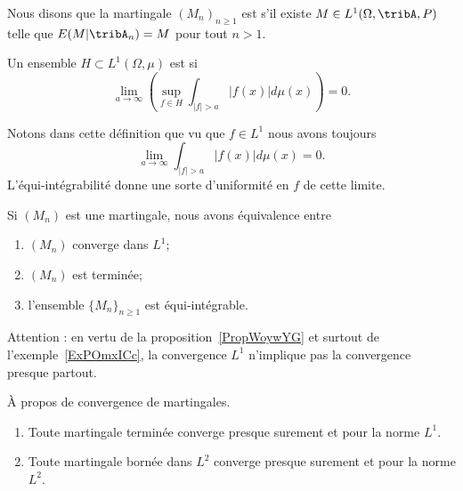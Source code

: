 \begin{definition}
    Nous disons que la martingale \( (M_n)_{n\geq 1}\) est  s'il existe \( M\in L^1(\Omega,\tribA,P)\) telle que \( E(M|\tribA_n)=M\) pour tout \( n>1\).
\end{definition}

\begin{definition}  \label{DefOZlZnse}
    Un ensemble \( H\subset L^1(\Omega,\mu)\) est  si
    \begin{equation}
        \lim_{a\to \infty}\left( \sup_{f\in H}\int_{  | f |>a   }| f(x) |d\mu(x) \right)=0.
    \end{equation}
\end{definition}
Notons dans cette définition que vu que \( f\in L^1\) nous avons toujours
\begin{equation}
    \lim_{a\to \infty}\int_{| f |>a}| f(x) |d\mu(x)=0.
\end{equation}
L'équi-intégrabilité donne une sorte d'uniformité en \( f\) de cette limite.

\begin{theorem} \label{ThoEFbpVXb}
    Si \( (M_n)\) est une martingale, nous avons équivalence entre
    \begin{enumerate}
        \item
            \( (M_n)\) converge dans \( L^1\);
        \item
            \( (M_n)\) est terminée;
        \item
            l'ensemble \( \{ M_n \}_{n\geq 1}\) est équi-intégrable.
    \end{enumerate}
\end{theorem}

Attention : en vertu de la proposition~\ref{PropWoywYG} et surtout de l'exemple~\ref{ExPOmxICc}, la convergence \( L^1\) n'implique pas la convergence presque partout.

\begin{theorem}   \label{ThoHBvnTRk}
    À propos de convergence de martingales.
    \begin{enumerate}
        \item
            Toute martingale terminée converge presque surement et pour la norme \( L^1\).
        \item
            Toute martingale bornée dans \( L^2\) converge presque surement et pour la norme \( L^2\).
    \end{enumerate}
\end{theorem}

